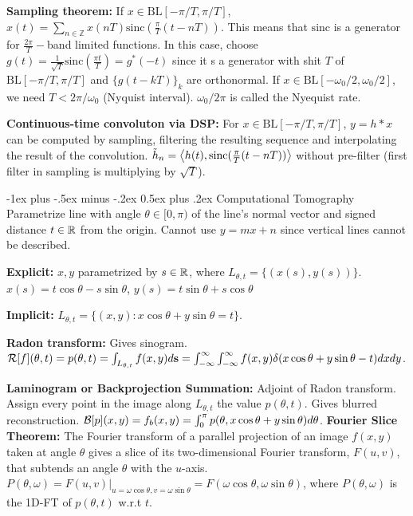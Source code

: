 \documentclass{article}
\makeatletter
\renewcommand{\section}{\@startsection{section}{1}{0mm}%
                                {-1ex plus -.5ex minus -.2ex}%
                                {0.5ex plus .2ex}%
                                {\color{blue!60}\normalfont\normalsize\bfseries}}
\makeatother
\begin{document}
\begin{multicols*}{3}
    \textbf{Sampling theorem: }If $x\in \text{BL}[-\pi/T,\pi/T]$, $x(t)=\sum_{n\in \mathbb{Z}}x(nT)\text{sinc}\left(\frac{\pi}{T}(t-nT)\right)$. This means that $\text{sinc}$ is a generator for $\frac{2\pi}{T}-$band limited functions. In this case, choose $g(t)=\frac{1}{\sqrt{T}}\text{sinc}\left( \frac{\pi t}{T} \right)=g^*(-t)$ since it s a generator with shit $T$ of $\text{BL}[-\pi/T,\pi/T]$ and $\{g(t-kT)\}_k$ are orthonormal. If $x\in \text{BL}[-\omega_0/2,\omega_0/2]$, we need $T<2\pi / \omega_0$ (Nyquist interval). $\omega_0 / 2\pi$ is called the Nyequist rate.
    
    \textbf{Continuous-time convoluton via DSP: }For $x\in\text{BL}[-\pi/T,\pi/T]$, $y=h\ast x$ can be computed by sampling, filtering the resulting sequence and interpolating the result of the convolution. $\tilde{h}_n=\left\langle h(t),\text{sinc}(\frac{\pi}{T} (t-nT)) \right\rangle$ without pre-filter (first filter in sampling is multiplying by $\sqrt{T}$).
    
    \section{Computational Tomography}
    Parametrize line with angle $\theta\in[0,\pi)$ of the line's normal vector and signed distance $t\in \mathbb{R}$ from the origin. Cannot use $y=mx+n$ since vertical lines cannot be described.
    
    \textbf{Explicit: }$x,y$ parametrized by $s\in\mathbb{R}$, where $L_{\theta, t}=\{(x(s),y(s))\}$. $x(s)=t\cos \theta - s \sin\theta$, $y(s)=t\sin\theta+s\cos\theta$
    
    \textbf{Implicit: }$L_{\theta,t}=\{(x,y):x\cos\theta+y\sin\theta= t\}$.
    
    \textbf{Radon transform: }Gives sinogram. $\mathcal{R}[f](\theta,t)=p(\theta,t)=\int_{L_{\theta,t}}f(x,y)d\mathbf{s}= \int_{-\infty}^\infty\int_{-\infty}^\infty f(x,y)\delta(x\cos\theta+y\sin\theta-t)dxdy$.
    
    \textbf{Laminogram or Backprojection Summation: }Adjoint of Radon transform. Assign every point in the image along $L_{\theta,t}$ the value $p(\theta,t)$. Gives blurred reconstruction. $\mathcal{B}[p](x,y)=f_b(x,y)=\int_{0}^\pi p(\theta,x\cos\theta+y\sin\theta)d\theta$.
    \textbf{Fourier Slice Theorem: } The Fourier transform of a parallel projection of an image $f (x, y )$ taken at angle $\theta$ gives a slice of its two-dimensional Fourier transform, $F (u, v )$, that subtends an angle $\theta$ with the $u$-axis. $P(\theta, \omega) = F (u, v )\rvert_{u=\omega \cos \theta, v=\omega \sin \theta} = F (\omega \cos \theta, \omega \sin \theta)$, where $P(\theta,\omega)$ is the 1D-FT of $p(\theta, t)$ w.r.t $t$.
    

\end{multicols*}
\end{document}
